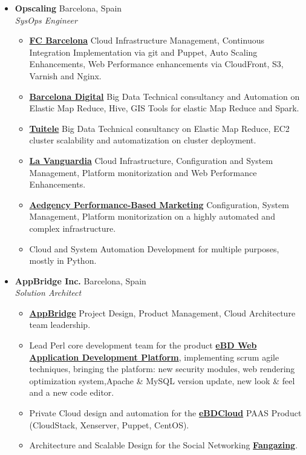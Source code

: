 \documentclass[]{friggeri-cv} %
\renewenvironment{entrylist}{%
  \begin{itemize}[leftmargin=1in]%
}{%
  \end{itemize}
}
\renewcommand{\entry}[4]{%
  \item[#1]
    \textbf{#2}%
    \hfill%
    {\footnotesize\addfontfeature{Color=lightgray} #3}\\%
    #4\vspace{\parsep}%
  }
\begin{document}
\begin{entrylist}
\entry
{2014--2014}
{Opscaling}
{Barcelona, Spain}
{\emph{SysOps Engineer} 
\begin{itemize}[label=\textbullet]
\item \href{http://www.fcbarcelona.com/}{\textbf{FC Barcelona}} Cloud Infrastructure Management, Continuous Integration Implementation via git and Puppet, Auto Scaling Enhancements, Web Performance enhancements via CloudFront, S3, Varnish and Nginx.
\item \href{http://www.bdigital.org/}{\textbf{Barcelona Digital}} Big Data Technical consultancy and Automation on Elastic Map Reduce, Hive, GIS Tools for elastic Map Reduce and Spark.
\item \href{http://www.tuitele.tv/}{\textbf{Tuitele}} Big Data Technical consultancy on Elastic Map Reduce, EC2 cluster scalability and automatization on cluster deployment.
\item \href{http://www.lavanguardia.com/}{\textbf{La Vanguardia}} Cloud Infrastructure, Configuration and System Management, Platform monitorization and Web Performance Enhancements.
\item \href{http://www.aedgency.com/}{\textbf{Aedgency Performance-Based Marketing}} Configuration, System Management, Platform monitorization on a highly automated and complex infrastructure.
\item Cloud and System Automation Development for multiple purposes, mostly in Python.   
\end{itemize}}
\entry
{2012--2014}
{AppBridge Inc.}
{Barcelona, Spain}
{\emph{Solution Architect} 
\begin{itemize}[label=\textbullet]
\item \href{http://www.appbridge.com}{\textbf{AppBridge}} Project Design, Product Management, Cloud Architecture team leadership.
\item Lead Perl core development team for the product \href{http://www.ebdsoft.com}{\textbf{eBD Web Application Development Platform}}, implementing scrum agile techniques, bringing the platform: new security modules, web rendering optimization system,Apache \& MySQL version update, new look \& feel and a new code editor.
\item Private Cloud design and automation for the  \href{http://www.ebdcloud.com}{\textbf{eBDCloud}} PAAS Product (CloudStack, Xenserver, Puppet, CentOS).
\item Architecture and Scalable Design for the Social Networking \href{http://www.fangazing.com/berto}{\textbf{Fangazing}}.

\end{itemize}}
\end{entrylist}
\end{document}
